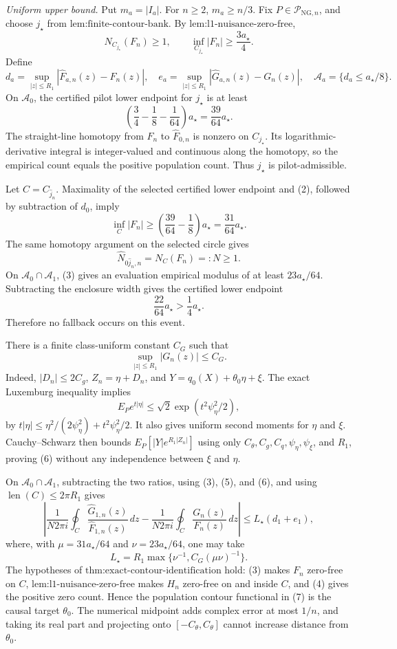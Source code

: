 \emph{Uniform upper bound.}  Put \(m_a=|I_a|\).  For \(n\ge2\), \(m_a\ge n/3\).  Fix \(P\in\mathcal P_{\mathrm{NG},n}\), and choose \(j_{\star}\) from \(\text{lem:finite-contour-bank}\).  By \(\text{lem:l1-nuisance-zero-free}\),
\[
 N_{C_{j_{\star}}}(F_n)\ge1,
 \qquad
 \inf_{C_{j_{\star}}}|F_n|
 \ge\frac{3a_{\star}}4. \tag{1}
\]
Define
\[
 d_a=\sup_{|z|\le R_1}|\widehat F_{a,n}(z)-F_n(z)|,
 \quad
 e_a=\sup_{|z|\le R_1}|\widehat G_{a,n}(z)-G_n(z)|,
 \quad
 \mathcal A_a=\{d_a\le a_{\star}/8\}.
\]
On \(\mathcal A_0\), the certified pilot lower endpoint for \(j_{\star}\) is at least
\[
 \left(\frac34-\frac18-\frac1{64}\right)a_{\star}
 =\frac{39}{64}a_{\star}. \tag{2}
\]
The straight-line homotopy from \(F_n\) to \(\widehat F_{0,n}\) is nonzero on \(C_{j_{\star}}\).  Its logarithmic-derivative integral is integer-valued and continuous along the homotopy, so the empirical count equals the positive population count.  Thus \(j_{\star}\) is pilot-admissible.

Let \(C=C_{\widehat j_n}\).  Maximality of the selected certified lower endpoint and (2), followed by subtraction of \(d_0\), imply
\[
 \inf_C|F_n|
 \ge\left(\frac{39}{64}-\frac18\right)a_{\star}
 =\frac{31}{64}a_{\star}. \tag{3}
\]
The same homotopy argument on the selected circle gives
\[
 \widehat N_{0\widehat j_n,n}=N_C(F_n)=:N\ge1. \tag{4}
\]
On \(\mathcal A_0\cap\mathcal A_1\), (3) gives an evaluation empirical modulus of at least \(23a_{\star}/64\).  Subtracting the enclosure width gives the certified lower endpoint
\[
 \frac{22}{64}a_{\star}>\frac14a_{\star}. \tag{5}
\]
Therefore no fallback occurs on this event.

There is a finite class-uniform constant \(C_G\) such that
\[
 \sup_{|z|\le R_1}|G_n(z)|\le C_G. \tag{6}
\]
Indeed, \(|D_n|\le2C_g\), \(Z_n=\eta+D_n\), and \(Y=q_0(X)+\theta_0\eta+\xi\).  The exact Luxemburg inequality implies
\[
 E_P e^{t|\eta|}
 \le \sqrt2\exp(t^2\psi_{\eta}^2/2),
\]
by \(t|\eta|\le \eta^2/(2\psi_{\eta}^2)+t^2\psi_{\eta}^2/2\).  It also gives uniform second moments for \(\eta\) and \(\xi\).  Cauchy--Schwarz then bounds \(E_P[|Y|e^{R_1|Z_n|}]\) using only \(C_{\theta},C_g,C_q,\psi_{\eta},\psi_{\xi}\), and \(R_1\), proving (6) without any independence between \(\xi\) and \(\eta\).

On \(\mathcal A_0\cap\mathcal A_1\), subtracting the two ratios, using (3), (5), and (6), and using \(\operatorname{len}(C)\le2\pi R_1\) gives
\[
 \left|
 \frac{1}{N2\pi i}\oint_C
 \frac{\widehat G_{1,n}(z)}{\widehat F_{1,n}(z)}\,dz
 -
 \frac{1}{N2\pi i}\oint_C
 \frac{G_n(z)}{F_n(z)}\,dz
 \right|
 \le L_{\star}(d_1+e_1), \tag{7}
\]
where, with \(\mu=31a_{\star}/64\) and \(\nu=23a_{\star}/64\), one may take
\[
 L_{\star}=R_1\max\{\nu^{-1},C_G(\mu\nu)^{-1}\}.
\]
The hypotheses of \(\text{thm:exact-contour-identification}\) hold: (3) makes \(F_n\) zero-free on \(C\), \(\text{lem:l1-nuisance-zero-free}\) makes \(H_n\) zero-free on and inside \(C\), and (4) gives the positive zero count.  Hence the population contour functional in (7) is the causal target \(\theta_0\).  The numerical midpoint adds complex error at most \(1/n\), and taking its real part and projecting onto \([-C_{\theta},C_{\theta}]\) cannot increase distance from \(\theta_0\).

